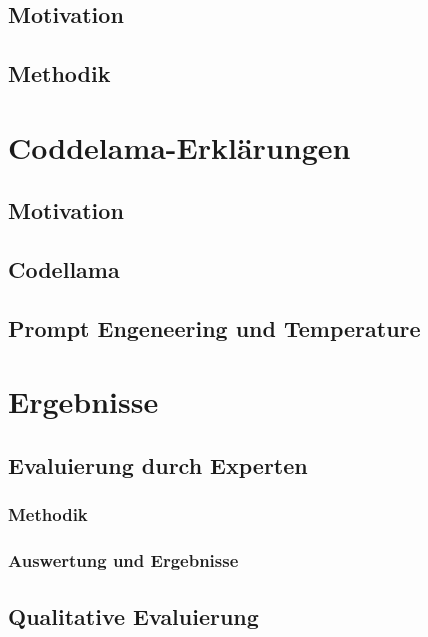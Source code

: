 \documentclass[12pt,letterpaper,ngerman]{article}
\begin{document}
\subsection{Motivation}
\subsection{Methodik}
\section{Coddelama-Erklärungen}
\subsection{Motivation}
\subsection{Codellama} 
\subsection{Prompt Engeneering und Temperature}
\section{Ergebnisse}
\subsection{Evaluierung durch Experten}
\subsubsection{Methodik}
\subsubsection{Auswertung und Ergebnisse}
\subsection{Qualitative Evaluierung} 
\end{document}
